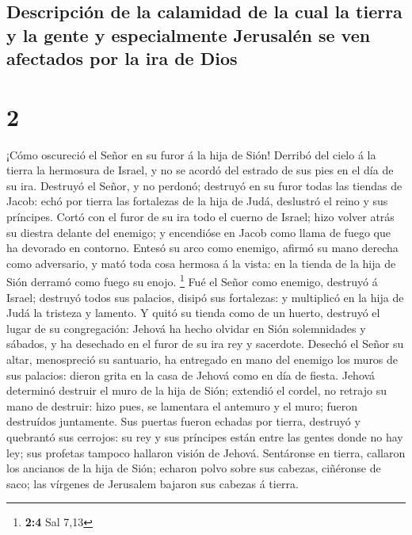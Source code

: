 \hypertarget{descripciuxf3n-de-la-calamidad-de-la-cual-la-tierra-y-la-gente-y-especialmente-jerusaluxe9n-se-ven-afectados-por-la-ira-de-dios}{%
\subsection{Descripción de la calamidad de la cual la tierra y la gente
y especialmente Jerusalén se ven afectados por la ira de
Dios}\label{descripciuxf3n-de-la-calamidad-de-la-cual-la-tierra-y-la-gente-y-especialmente-jerusaluxe9n-se-ven-afectados-por-la-ira-de-dios}}

\hypertarget{section-1}{%
\section{2}\label{section-1}}

 ¡Cómo oscureció el Señor en su furor á la hija de Sión!
Derribó del cielo á la tierra la hermosura de Israel, y no se acordó del
estrado de sus pies en el día de su ira.  Destruyó el Señor,
y no perdonó; destruyó en su furor todas las tiendas de Jacob: echó por
tierra las fortalezas de la hija de Judá, deslustró el reino y sus
príncipes.  Cortó con el furor de su ira todo el cuerno de
Israel; hizo volver atrás su diestra delante del enemigo; y encendióse
en Jacob como llama de fuego que ha devorado en contorno. 
Entesó su arco como enemigo, afirmó su mano derecha como adversario, y
mató toda cosa hermosa á la vista: en la tienda de la hija de Sión
derramó como fuego su enojo. \footnote{\textbf{2:4} Sal 7,13}
 Fué el Señor como enemigo, destruyó á Israel; destruyó
todos sus palacios, disipó sus fortalezas: y multiplicó en la hija de
Judá la tristeza y lamento.  Y quitó su tienda como de un
huerto, destruyó el lugar de su congregación: Jehová ha hecho olvidar en
Sión solemnidades y sábados, y ha desechado en el furor de su ira rey y
sacerdote.  Desechó el Señor su altar, menospreció su
santuario, ha entregado en mano del enemigo los muros de sus palacios:
dieron grita en la casa de Jehová como en día de fiesta. 
Jehová determinó destruir el muro de la hija de Sión; extendió el
cordel, no retrajo su mano de destruir: hizo pues, se lamentara el
antemuro y el muro; fueron destruídos juntamente.  Sus
puertas fueron echadas por tierra, destruyó y quebrantó sus cerrojos: su
rey y sus príncipes están entre las gentes donde no hay ley; sus
profetas tampoco hallaron visión de Jehová.  Sentáronse en
tierra, callaron los ancianos de la hija de Sión; echaron polvo sobre
sus cabezas, ciñéronse de saco; las vírgenes de Jerusalem bajaron sus
cabezas á tierra.

